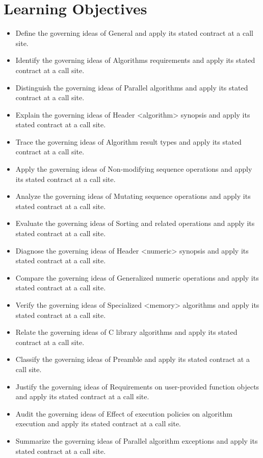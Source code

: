 \documentclass[11pt,letterpaper]{article}
\begin{document}
\section{Learning Objectives}
\begin{itemize}[label=\textcolor{CornellReferenceTeal}{$\blacktriangleright$}]
\item Define the governing ideas of General and apply its stated contract at a call site.
\item Identify the governing ideas of Algorithms requirements and apply its stated contract at a call site.
\item Distinguish the governing ideas of Parallel algorithms and apply its stated contract at a call site.
\item Explain the governing ideas of Header <algorithm> synopsis and apply its stated contract at a call site.
\item Trace the governing ideas of Algorithm result types and apply its stated contract at a call site.
\item Apply the governing ideas of Non-modifying sequence operations and apply its stated contract at a call site.
\item Analyze the governing ideas of Mutating sequence operations and apply its stated contract at a call site.
\item Evaluate the governing ideas of Sorting and related operations and apply its stated contract at a call site.
\item Diagnose the governing ideas of Header <numeric> synopsis and apply its stated contract at a call site.
\item Compare the governing ideas of Generalized numeric operations and apply its stated contract at a call site.
\item Verify the governing ideas of Specialized <memory> algorithms and apply its stated contract at a call site.
\item Relate the governing ideas of C library algorithms and apply its stated contract at a call site.
\item Classify the governing ideas of Preamble and apply its stated contract at a call site.
\item Justify the governing ideas of Requirements on user-provided function objects and apply its stated contract at a call site.
\item Audit the governing ideas of Effect of execution policies on algorithm execution and apply its stated contract at a call site.
\item Summarize the governing ideas of Parallel algorithm exceptions and apply its stated contract at a call site.
\end{itemize}
\end{document}
